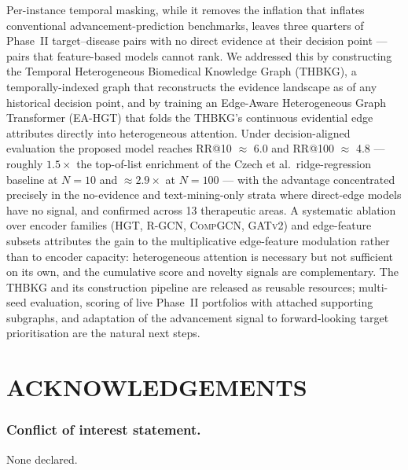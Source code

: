 \documentclass[a4,center]{NAR}
\newcommand{\hgt}{\textsc{HGT}}
\newcommand{\gatv}{\textsc{GATv2}}
\newcommand{\rgcn}{\textsc{R-GCN}}
\newcommand{\compgcn}{\textsc{CompGCN}}
\newcommand{\eahgt}{\textsc{EA-HGT}}
\begin{document}
{Per-instance temporal masking, while it removes the inflation that
inflates conventional advancement-prediction benchmarks, leaves three
quarters of Phase~II target--disease pairs with no direct evidence at
their decision point --- pairs that feature-based models cannot rank.
We addressed this by constructing the Temporal Heterogeneous Biomedical
Knowledge Graph (THBKG), a temporally-indexed graph that reconstructs
the evidence landscape as of any historical decision point, and by
training an Edge-Aware Heterogeneous Graph Transformer (\eahgt{}) that
folds the THBKG's continuous evidential edge attributes directly into
heterogeneous attention. Under decision-aligned evaluation the proposed
model reaches RR@10 $\approx$ 6.0 and RR@100 $\approx$ 4.8 ---
roughly $1.5\times$ the top-of-list enrichment of the Czech et al.\
ridge-regression baseline at $N = 10$ and $\approx 2.9\times$ at $N =
100$ --- with the advantage concentrated precisely in the
no-evidence and text-mining-only strata where direct-edge models have
no signal, and confirmed across 13 therapeutic areas. A systematic
ablation over encoder families (\hgt{}, \rgcn{}, \compgcn{}, \gatv{})
and edge-feature subsets attributes the gain to the multiplicative
edge-feature modulation rather than to encoder capacity: heterogeneous
attention is necessary but not sufficient on its own, and the
cumulative score and novelty signals are complementary. The THBKG and
its construction pipeline are released as reusable resources;
multi-seed evaluation, scoring of live Phase~II portfolios with
attached supporting subgraphs, and adaptation of the advancement signal
to forward-looking target prioritisation are the natural next steps.


\section{ACKNOWLEDGEMENTS}


\subsubsection{Conflict of interest statement.} None declared.

\newpage




}
\end{document}
